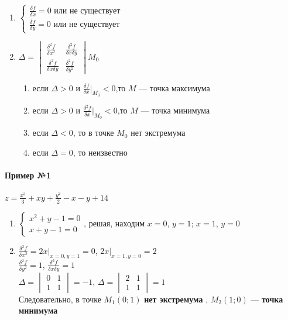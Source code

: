 \documentclass{article}
\begin{document}
\begin{enumerate}
    \item $\begin{cases}
        \frac{\delta f}{\delta x} = 0  \text{ или не существует }\\
        \frac{\delta f}{\delta y} = 0 \text{ или не существует }
    \end{cases}$
    \item $\Delta = \begin{vmatrix}
            \frac{\delta^2 f}{\delta x^2} & \frac{\delta^2 f}{\delta x \delta y} \\
            \frac{\delta^2 f}{\delta x \delta y} & \frac{\delta^2 f}{\delta y^2}
        \end{vmatrix} M_0
    $
    \begin{enumerate}
        \item если $\Delta > 0$ и $\frac{\delta f}{\delta x} \bigg|_{M_0} < 0$,то $M$ — точка максимума
        \item если $\Delta > 0$ и $\frac{\delta^2 f}{\delta x} \bigg|_{M_0} < 0$,то $M$ — точка минимума
        \item если $\Delta < 0$, то в точке $M_0$ нет экстремума
        \item если $\Delta = 0$, то неизвестно
    \end{enumerate}
\end{enumerate}

\paragraph{Пример №1}

$z = \frac{x^3}{3} + x y + \frac{y^2}{2} - x - y + 14$

\begin{enumerate}
    \item $
    \begin{cases}
        x^2 + y - 1 = 0 \\
        x + y - 1 = 0
    \end{cases}
    $, решая, находим $x = 0$, $y = 1$; $x = 1$, $y = 0$
    \item $\frac{\delta^2 f}{\delta x^2} = 2 x \bigg|_{x = 0, y = 1} = 0$, $2x \bigg|_{x = 1, y = 0} = 2$ \\
    $\frac{\delta^2 f}{\delta y^2} = 1$, $\frac{\delta^2 f}{\delta x \delta y} = 1$ \\
    $\Delta = \begin{vmatrix}
        0 & 1 \\
        1 & 1
    \end{vmatrix} = -1$, $\Delta = \begin{vmatrix}
        2 & 1 \\
        1 & 1
    \end{vmatrix} = 1$ \\
    Следовательно, в точке $M_1 (0; 1)$ \textbf{нет экстремума} , $M_2 (1; 0)$ — \textbf{точка минимума}
\end{enumerate}
\end{document}
